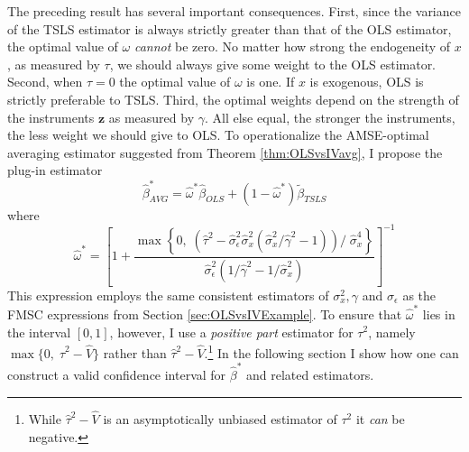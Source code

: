 The preceding result has several important consequences. 
First, since the variance of the TSLS estimator is always strictly greater than that of the OLS estimator, the optimal value of $\omega$ \emph{cannot} be zero. 
No matter how strong the endogeneity of $x$,
as measured by $\tau$, we should always give some weight to the OLS estimator. 
Second, when $\tau = 0$ the optimal value of $\omega$ is one. If $x$ is exogenous, OLS is strictly preferable to TSLS. 
Third, the optimal weights depend on the strength of the instruments $\mathbf{z}$ as measured by $\gamma$.
All else equal, the stronger the instruments, the less weight we should give to OLS.
To operationalize the AMSE-optimal averaging estimator suggested from Theorem \ref{thm:OLSvsIVavg}, I propose the plug-in estimator 
\begin{equation}
	\widehat{\beta}^*_{AVG} = \widehat{\omega}^* \widehat{\beta}_{OLS} + (1 - \widehat{\omega}^*)\widetilde{\beta}_{TSLS}
	\label{eq:OLSvsIV_AVG1}
\end{equation}
where
\begin{equation}
\widehat{\omega }^* = \left[1 + \frac{\max \left\{0, \; \left(\widehat{\tau}^2 - \widehat{\sigma}_\epsilon^2\widehat{\sigma}_x^2  \left(\widehat{\sigma}_x^2/\widehat{\gamma}^2 - 1 \right) \right)/\;\widehat{\sigma}_x^4 \right\}}{\widehat{\sigma}_\epsilon^2 (1/\widehat{\gamma}^2 - 1/\widehat{\sigma}_x^2)}\right]^{-1}
	\label{eq:OLSvsIV_AVG2}
\end{equation}
This expression employs the same consistent estimators of $\sigma_x^2, \gamma$ and $\sigma_{\epsilon}$ as the FMSC expressions from Section \ref{sec:OLSvsIVExample}.
To ensure that $\widehat{\omega}^*$ lies in the interval $[0,1]$, however, I use a \emph{positive part} estimator for $\tau^2$, namely $\max\{0, \; \widehat{\tau}^2 - \widehat{V}\}$ rather than $\widehat{\tau}^2 - \widehat{V}$.\footnote{While $\widehat{\tau}^2 - \widehat{V}$ is an asymptotically unbiased estimator of $\tau^2$ it \emph{can} be negative.}
In the following section I show how one can construct a valid confidence interval for $\widehat{\beta}^*$ and related estimators.
